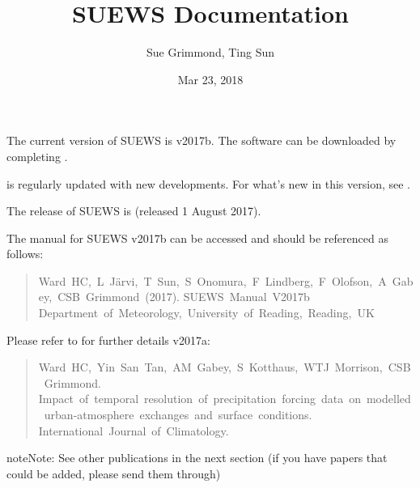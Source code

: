 \documentclass[letterpaper,10pt,english]{sphinxmanual}
\title{SUEWS Documentation}
\date{Mar 23, 2018}
\author{Sue Grimmond, Ting Sun}
\begin{document}
\maketitle
\sphinxtableofcontents
{}\label{\detokenize{index::doc}}


The current version of SUEWS is v2017b. The software can be downloaded
by completing .

{\hyperref[\detokenize{index:index-page}]{}} is regularly
updated with new developments. For what’s new in this version, see {\hyperref[\detokenize{version-history:new-latest}]{}}.

The  release of SUEWS is  (released 1 August
2017).

The manual for SUEWS v2017b can be accessed
 and should be referenced as
follows:
\begin{quote}

Ward HC, L Järvi, T Sun, S Onomura, F Lindberg, F Olofson, A Gabey, CSB Grimmond (2017).
SUEWS Manual V2017b Department of Meteorology, University of Reading, Reading, UK
\end{quote}

Please refer to  for
further details v2017a:
\begin{quote}

Ward HC, Yin San Tan, AM Gabey, S Kotthaus, WTJ Morrison, CSB Grimmond.
Impact of temporal resolution of precipitation forcing data on modelled urban-atmosphere exchanges and surface conditions.
International Journal of Climatology.
\end{quote}

\begin{sphinxadmonition}{note}{Note:}
See other publications in the next section (if you have papers that could be added, please send them through)
\end{sphinxadmonition}
\end{document}
